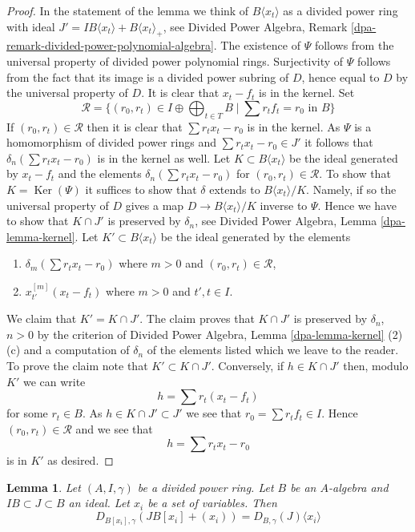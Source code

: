 \documentclass{stacks-project}
\theoremstyle{plain}
\newtheorem{lemma}[subsection]{Lemma}
\theoremstyle{definition}
\theoremstyle{remark}
\numberwithin{equation}{subsection}
\def\Ker{\mathop{\mathrm{Ker}}}
\begin{document}
\begin{proof}
In the statement of the lemma we think of $B\langle x_t \rangle$
as a divided power ring with ideal
$J' = IB\langle x_t \rangle + B\langle x_t \rangle_{+}$, see
Divided Power Algebra, Remark \ref{dpa-remark-divided-power-polynomial-algebra}.
The existence of $\Psi$ follows from the universal property of
divided power polynomial rings. Surjectivity of $\Psi$ follows from
the fact that its image is a divided power subring of $D$, hence equal to $D$
by the universal property of $D$. It is clear that
$x_t - f_t$ is in the kernel. Set
$$
\mathcal{R} = \{(r_0, r_t) \in I \oplus \bigoplus\nolimits_{t \in T} B
\mid \sum r_t f_t = r_0 \text{ in }B\}
$$
If $(r_0, r_t) \in \mathcal{R}$ then it is clear that
$\sum r_t x_t - r_0$ is in the kernel.
As $\Psi$ is a homomorphism of divided power rings
and $\sum r_tx_t - r_0 \in J'$
it follows that $\delta_n(\sum r_t x_t - r_0)$ is in the kernel as well.
Let $K \subset B\langle x_t \rangle$ be the ideal generated by
$x_t - f_t$ and the elements $\delta_n(\sum r_t x_t - r_0)$ for
$(r_0, r_t) \in \mathcal{R}$.
To show that $K = \Ker(\Psi)$ it suffices to show that
$\delta$ extends to $B\langle x_t \rangle/K$. Namely, if so the universal
property of $D$ gives a map $D \to B\langle x_t \rangle/K$
inverse to $\Psi$. Hence we have to show that $K \cap J'$ is
preserved by $\delta_n$, see
Divided Power Algebra, Lemma \ref{dpa-lemma-kernel}.
Let $K' \subset B\langle x_t \rangle$ be the ideal
generated by the elements
\begin{enumerate}
\item $\delta_m(\sum r_t x_t - r_0)$ where $m > 0$ and
$(r_0, r_t) \in \mathcal{R}$,
\item $x_{t'}^{[m]}(x_t - f_t)$ where $m > 0$ and $t', t \in I$.
\end{enumerate}
We claim that $K' = K \cap J'$. The claim proves that $K \cap J'$
is preserved by $\delta_n$, $n > 0$ by the criterion of
Divided Power Algebra, Lemma \ref{dpa-lemma-kernel} (2)(c)
and a computation of $\delta_n$
of the elements listed which we leave to the reader.
To prove the claim note that $K' \subset K \cap J'$.
Conversely, if $h \in K \cap J'$ then, modulo $K'$ we can write
$$
h = \sum r_t (x_t - f_t)
$$
for some $r_t \in B$. As $h \in K \cap J' \subset J'$
we see that $r_0 = \sum r_t f_t \in I$. Hence $(r_0, r_t) \in \mathcal{R}$
and we see that
$$
h = \sum r_t x_t - r_0
$$
is in $K'$ as desired.
\end{proof}

\begin{lemma}
\label{lemma-divided-power-envelope-add-variables}
Let $(A, I, \gamma)$ be a divided power ring.
Let $B$ be an $A$-algebra and $IB \subset J \subset B$ an ideal.
Let $x_i$ be a set of variables. Then
$$
D_{B[x_i], \gamma}(JB[x_i] + (x_i)) = D_{B, \gamma}(J) \langle x_i \rangle
$$
\end{lemma}
\end{document}
